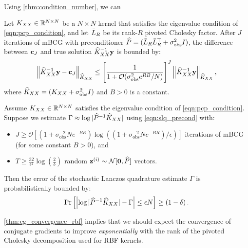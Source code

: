 Using \cref{thm:condition_number}, we can 
%
\begin{theorem}
  \label{thm:precond_mbcg_solves}
  Let $K_{XX} \in \mathbb{R}^{N \times N}$ be a $N \times N$ kernel that satisfies the eigenvalue condition of \cref{eqn:pcp_condition},
	and let $\bar{L}_R$ be its rank-$R$ pivoted Cholesky factor.
	After $J$ iterations of mBCG with preconditioner $\widehat{P} = (\bar{L}_R \bar{L}_R^\top + \sigma_\text{obs}^2 I)$,
	the difference between $\mathbf{c}_J$ and true solution $\widehat{K}_{XX}^{-1} \mathbf{y}$ is bounded by:
  \begin{equation*}
    \left \Vert \trainK^{-1} \by - \bc_{J} \right \Vert_{\trainK}
    \leq \Bigg[ \frac 1 {1 + \bigo{\sigma^{2}_\text{obs} e^{RB}/N}} \Bigg]^{J}
    \left \Vert \trainK^{-1} \by \right \Vert_{\trainK},
		\nonumber
  \end{equation*}
	where $\widehat{K}_{XX} = (K_{XX} + \sigma^2_\text{obs} I)$ and $B > 0$ is a constant.
\end{theorem}
%
\begin{theorem}
  \label{thm:precond_mbcg_logdet}
  Assume $K_{XX} \in \mathbb{R}^{N \times N}$ satisfies the eigenvalue condition of \cref{eqn:pcp_condition}.
	Suppose we estimate $\Gamma \approx \log \vert \widehat{P}^{-1} \widehat{K}_{XX} \vert$ using \cref{eqn:slq_precond} with:
	\begin{itemize}
		\item $J \geq \mathcal{O} \left[ (1 + \sigma^{-2}_\text{obs} N e^{-BR}) \log \left( ( 1 + \sigma^{-2}_\text{obs} N e^{-BR} ) / \epsilon \right) \right]$ iterations of mBCG (for some constant $B > 0$), and
		\item $T \geq \frac{32}{\epsilon^2} \log \left( \frac 2 \delta \right)$ random $\bz^{(i)} \sim \normaldist{\bzero}{\trainP}$ vectors.
	\end{itemize}
  Then the error of the stochastic Lanczos quadrature estimate $\Gamma$ is probabilistically bounded by:
  \begin{equation*}
    \textrm{Pr}\left[\Bigl\vert \log \vert \widehat{P}^{-1} \widehat{K}_{XX} \vert - \Gamma \Bigr\vert \leq \epsilon N \right] \geq \left( 1 - \delta \right).
  \end{equation*}
\end{theorem}
%
\cref{thm:cg_convergence_rbf} implies that we should expect the convergence of conjugate gradients to improve \emph{exponentially} with the rank of the pivoted Cholesky decomposition used for RBF kernels.
